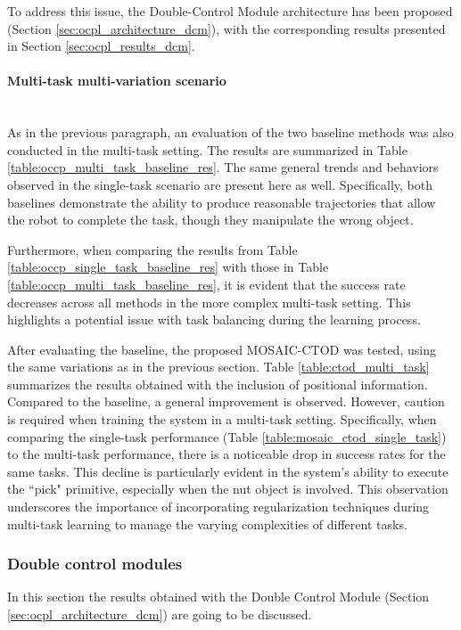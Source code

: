 To address this issue, the Double-Control Module architecture has been proposed (Section \ref{sec:ocpl_architecture_dcm}), with the corresponding results presented in Section \ref{sec:ocpl_results_dcm}.

\paragraph*{Multi-task multi-variation scenario}\mbox{}\\
As in the previous paragraph, an evaluation of the two baseline methods was also conducted in the multi-task setting. The results are summarized in Table \ref{table:occp_multi_task_baseline_res}. The same general trends and behaviors observed in the single-task scenario are present here as well. Specifically, both baselines demonstrate the ability to produce reasonable trajectories that allow the robot to complete the task, though they manipulate the wrong object.

Furthermore, when comparing the results from Table \ref{table:occp_single_task_baseline_res} with those in Table \ref{table:occp_multi_task_baseline_res}, it is evident that the success rate decreases across all methods in the more complex multi-task setting. This highlights a potential issue with task balancing during the learning process.


After evaluating the baseline, the proposed MOSAIC-CTOD was tested, using the same variations as in the previous section. Table \ref{table:ctod_multi_task} summarizes the results obtained with the inclusion of positional information. Compared to the baseline, a general improvement is observed. However, caution is required when training the system in a multi-task setting. Specifically, when comparing the single-task performance (Table \ref{table:mosaic_ctod_single_task}) to the multi-task performance, there is a noticeable drop in success rates for the same tasks. This decline is particularly evident in the system's ability to execute the ``pick" primitive, especially when the nut object is involved. This observation underscores the importance of incorporating regularization techniques during multi-task learning to manage the varying complexities of different tasks.


\subsubsection{Double control modules}
In this section the results obtained with the Double Control Module (Section \ref{sec:ocpl_architecture_dcm}) are going to be discussed.
\label{sec:ocpl_results_dcm}
